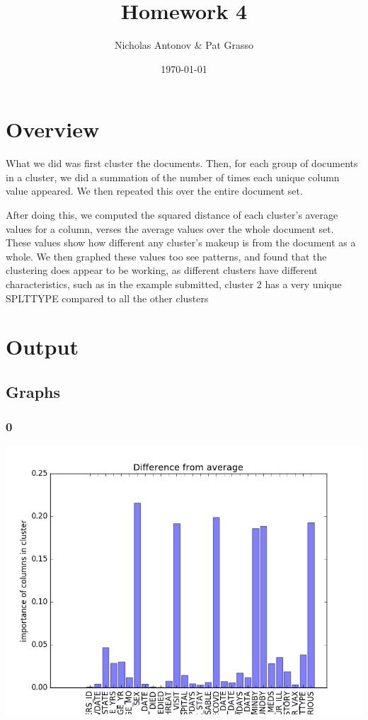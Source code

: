 \documentclass[11pt]{article}
\author{Nicholas Antonov \& Pat Grasso}
\date{\today}
\title{Homework 4}
\begin{document}
\maketitle
\tableofcontents


\section{Overview}
\label{sec:orgheadline1}

What we did was first cluster the documents. Then, for each group of documents in a cluster, we did a summation of the number of times each unique column value appeared. We then repeated this over the entire document set.

After doing this, we computed the squared distance of each cluster's average values for a column, verses the average values over the whole document set. These values show how different any cluster's makeup is from the document as a whole. We then graphed these values too see patterns, and found that the clustering does appear to be working, as different clusters have different characteristics, such as in the example submitted, cluster 2 has a very unique SPLTTYPE compared to all the other clusters

\section{Output}
\label{sec:orgheadline9}

\subsection{Graphs}
\label{sec:orgheadline7}

\subsubsection{0}
\label{sec:orgheadline2}
\includegraphics[width=.9\linewidth]{./cluster-weight-0.png}
\end{document}

